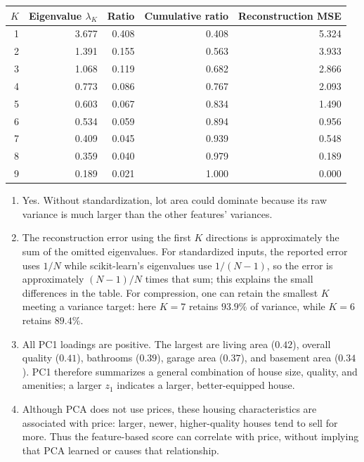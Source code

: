 \documentclass[10pt]{article}
\begin{document}
\begin{center}
\small
\begin{tabular}{rrrrr}
\toprule
$K$ & Eigenvalue $\lambda_K$ & Ratio & Cumulative ratio & Reconstruction MSE\\
\midrule
1 & 3.677 & 0.408 & 0.408 & 5.324\\
2 & 1.391 & 0.155 & 0.563 & 3.933\\
3 & 1.068 & 0.119 & 0.682 & 2.866\\
4 & 0.773 & 0.086 & 0.767 & 2.093\\
5 & 0.603 & 0.067 & 0.834 & 1.490\\
6 & 0.534 & 0.059 & 0.894 & 0.956\\
7 & 0.409 & 0.045 & 0.939 & 0.548\\
8 & 0.359 & 0.040 & 0.979 & 0.189\\
9 & 0.189 & 0.021 & 1.000 & 0.000\\
\bottomrule
\end{tabular}
\end{center}

\begin{enumerate}[label=\textbf{Q1.\arabic*:}]
\item Yes. Without standardization, lot area could dominate because its raw
variance is much larger than the other features' variances.
\item The reconstruction error using the first $K$ directions is approximately
the sum of the omitted eigenvalues. For standardized inputs, the reported
error uses $1/N$ while scikit-learn's eigenvalues use $1/(N-1)$, so the error
is approximately $(N-1)/N$ times that sum; this explains the small differences
in the table. For compression, one can retain the smallest $K$ meeting a
variance target: here $K=7$ retains $93.9\%$ of variance, while $K=6$
retains $89.4\%$.
\item All PC1 loadings are positive. The largest are living area ($0.42$),
overall quality ($0.41$), bathrooms ($0.39$), garage area ($0.37$), and
basement area ($0.34$). PC1 therefore summarizes a general combination of
house size, quality, and amenities; a larger $z_1$ indicates a larger,
better-equipped house.
\item Although PCA does not use prices, these housing characteristics are
associated with price: larger, newer, higher-quality houses tend to sell for
more. Thus the feature-based score can correlate with price, without implying
that PCA learned or causes that relationship.
\end{enumerate}
\end{document}
